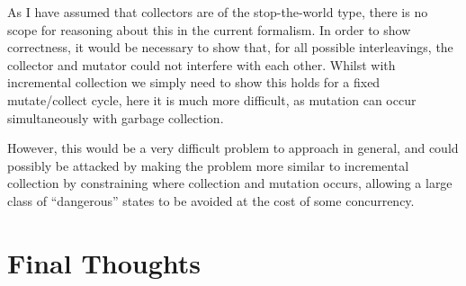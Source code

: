 As I have assumed that collectors are of the stop-the-world type,
there is no scope for reasoning about this in the current
formalism. In order to show correctness, it would be necessary to show
that, for all possible interleavings, the collector and mutator could
not interfere with each other. Whilst with incremental collection we
simply need to show this holds for a fixed mutate/collect cycle, here
it is much more difficult, as mutation can occur simultaneously with
garbage collection.

However, this would be a very difficult problem to approach in
general, and could possibly be attacked by making the problem more
similar to incremental collection by constraining where collection and
mutation occurs, allowing a large class of ``dangerous'' states to be
avoided at the cost of some concurrency.

\section{Final Thoughts}
\label{sec:conclusion-thoughts}

